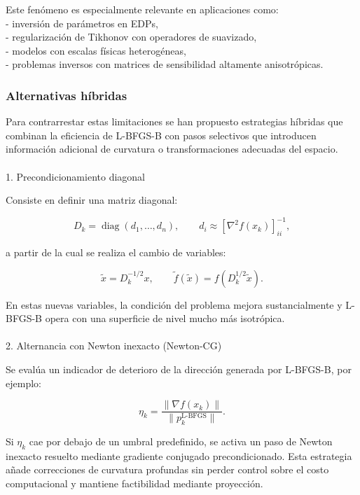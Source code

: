 \documentclass[
  spanish,
  us-letterpaper,
]{scrreprt}
\makeatletter
\let\oldparagraph\paragraph
\renewcommand{\paragraph}{
    \@ifstar
      \xxxParagraphStar
      \xxxParagraphNoStar
  }
\newcommand{\xxxParagraphStar}[1]{\oldparagraph*{#1}\mbox{}}
\newcommand{\xxxParagraphNoStar}[1]{\oldparagraph{#1}\mbox{}}
\numberwithin{equation}{section}
\makeatother
\begin{document}
Este fenómeno es especialmente relevante en aplicaciones como:\\
- inversión de parámetros en EDPs,\\
- regularización de Tikhonov con operadores de suavizado,\\
- modelos con escalas físicas heterogéneas,\\
- problemas inversos con matrices de sensibilidad altamente
anisotrópicas.

\subsubsection{Alternativas híbridas}\label{alternativas-huxedbridas}

Para contrarrestar estas limitaciones se han propuesto estrategias
híbridas que combinan la eficiencia de L-BFGS-B con pasos selectivos que
introducen información adicional de curvatura o transformaciones
adecuadas del espacio.

\paragraph{1. Precondicionamiento
diagonal}\label{precondicionamiento-diagonal}

Consiste en definir una matriz diagonal:

\[
D_k = \operatorname{diag}(d_1,\dots,d_n), \qquad d_i \approx [\nabla^2 f(x_k)]_{ii}^{-1},
\]

a partir de la cual se realiza el cambio de variables:

\[
\tilde{x} = D_k^{-1/2} x, \qquad 
\tilde{f}(\tilde{x}) = f(D_k^{1/2}\tilde{x}).
\]

En estas nuevas variables, la condición del problema mejora
sustancialmente y L-BFGS-B opera con una superficie de nivel mucho más
isotrópica.

\paragraph{2. Alternancia con Newton inexacto
(Newton-CG)}\label{alternancia-con-newton-inexacto-newton-cg}

Se evalúa un indicador de deterioro de la dirección generada por
L-BFGS-B, por ejemplo:

\[
\eta_k = \frac{\|\nabla f(x_k)\|}{\|p_k^{\text{L-BFGS}}\|}.
\]

Si \(\eta_k\) cae por debajo de un umbral predefinido, se activa un paso
de Newton inexacto resuelto mediante gradiente conjugado
precondicionado. Esta estrategia añade correcciones de curvatura
profundas sin perder control sobre el costo computacional y mantiene
factibilidad mediante proyección.
\end{document}
